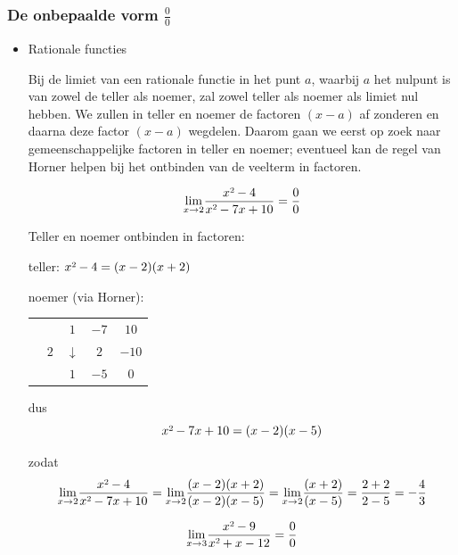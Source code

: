 \subsubsection{De onbepaalde vorm $\frac{0}{0}$}

\begin{itemize}
\item{Rationale functies}

Bij de limiet van een rationale functie in het punt $a$, waarbij
$a$ het nulpunt is van zowel de teller als noemer, zal zowel teller
als noemer als limiet nul hebben. We zullen in teller en noemer de
factoren $(x-a)$ af zonderen en daarna deze factor $(x-a)$ wegdelen.
Daarom gaan we eerst op zoek naar gemeenschappelijke factoren in teller
en noemer; eventueel kan de regel van Horner helpen bij het ontbinden
van de veelterm in factoren.


\begin{voorbeeld}
\begin{equation*}
{\displaystyle {\displaystyle \lim_{x\to2}}\frac{x\text{\texttwosuperior}-4}{x\text{\texttwosuperior}-7x+10}=\frac{0}{0}}
\end{equation*}

Teller en noemer ontbinden in factoren:

teller: $x\text{\texttwosuperior}-4=(x-2)(x+2)$

noemer (via Horner): %
\begin{tabular}{cc|ccc}
	&  & $1$ & $-7$ & $10$\\
	& $2$ & $\downarrow$ & $2$ & $-10$\\
	\cline{2-5} 
	&  & $1$ & \multicolumn{1}{c||}{$-5$} & $0$\\
\end{tabular}

dus \begin{equation*}
x\text{\texttwosuperior}-7x+10=(x-2)(x-5)
\end{equation*}

zodat \begin{equation*}
{\displaystyle {\displaystyle \lim_{x\to2}}\frac{x\text{\texttwosuperior}-4}{x\text{\texttwosuperior}-7x+10}={\displaystyle \lim_{x\to2}}\frac{(x-2)(x+2)}{(x-2)(x-5)}={\displaystyle \lim_{x\to2}}\frac{(x+2)}{(x-5)}=\frac{2+2}{2-5}=-\frac{4}{3}}
\end{equation*}
\end{voorbeeld}


\begin{voorbeeld}
	\begin{equation*}
{\displaystyle {\displaystyle \lim_{x\to3}}\frac{x\text{\texttwosuperior}-9}{x\text{\texttwosuperior}+x-12}=\frac{0}{0}}
\end{equation*}


\end{voorbeeld}
\end{itemize}
